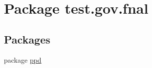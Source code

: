 \hypertarget{namespacetest_1_1gov_1_1fnal}{\section{Package test.\-gov.\-fnal}
\label{namespacetest_1_1gov_1_1fnal}
}
\subsection*{Packages}
\begin{DoxyCompactItemize}
\item 
package \hyperlink{namespacetest_1_1gov_1_1fnal_1_1ppd}{ppd}
\end{DoxyCompactItemize}
